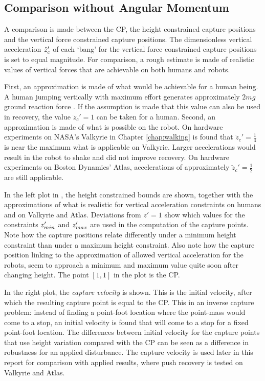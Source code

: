 \subsection{Comparison without Angular Momentum}\label{sec:capcomparenoinertia}
A comparison is made between the \ac{CP}, the height constrained capture positions and the vertical force constrained capture positions. The dimensionless vertical acceleration $\ddot{z}_{c}'$ of each `bang' for the vertical force constrained capture positions is set to equal magnitude. For comparison, a rough estimate is made of realistic values of vertical forces that are achievable on both humans and robots.

First, an approximation is made of what would be achievable for a human being. A human jumping vertically with maximum effort generates approximately $2mg$ ground reaction force \cite{linthorne2001analysis}. If the assumption is made that this value can also be used in recovery, the value $\ddot{z}_c'=1$ can be taken for a human. Second, an approximation is made of what is possible on the robot. On hardware experiments on NASA's Valkyrie in Chapter \ref{chap:walking} is found that $\ddot{z}_c'=\frac{1}{4}$ is near the maximum what is applicable on Valkyrie. Larger accelerations would result in the robot to shake and did not improve recovery. On hardware experiments on Boston Dynamics' Atlas, accelerations of approximately $\ddot{z}_c'=\frac{1}{2}$ are still applicable.

In the left plot in , the height constrained bounds are shown, together with the approximations of what is realistic for vertical acceleration constraints on humans and on Valkyrie and Atlas. Deviations from $z'=1$ show which values for the constraints $z_{min}'$ and $z_{max}'$ are used in the computation of the capture points. Note how the capture positions relate differently under a minimum height constraint than under a maximum height constraint. Also note how the capture position linking to the approximation of allowed vertical acceleration for the robots, seem to approach a minimum and maximum value quite soon after changing height. The point $[1,1]$ in the plot is the \ac{CP}. 

In the right plot, the \textit{capture velocity} is shown. This is the initial velocity, after which the resulting capture point is equal to the \ac{CP}. This in an inverse capture problem: instead of finding a point-foot location where the point-mass would come to a stop, an initial velocity is found that will come to a stop for a fixed point-foot location. The differences between initial velocity for the capture points that use height variation compared with the \ac{CP} can be seen as a difference in robustness for an applied disturbance. The capture velocity is used later in this report for comparison with applied results, where push recovery is tested on Valkyrie and Atlas.

